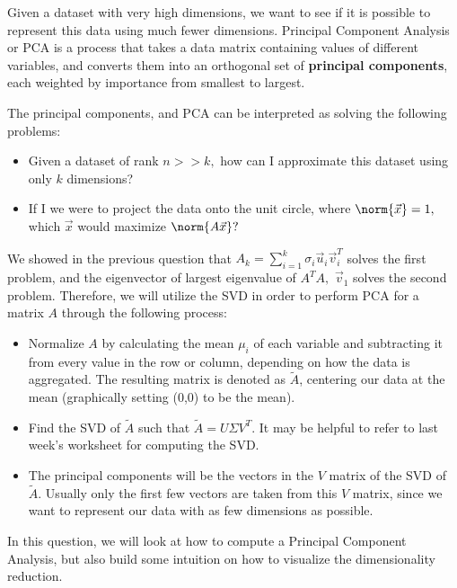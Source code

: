 

Given a dataset with very high dimensions, we want to see if it is possible to represent this data using much fewer dimensions.
Principal Component Analysis or PCA is a process that takes a data matrix containing values of different variables, and converts them into an orthogonal set of \textbf{principal components}, each weighted by importance from smallest to largest.

The principal components, and PCA can be interpreted as solving the following problems:
\begin{itemize}
  \item Given a dataset of rank $n >> k,$ how can I approximate this dataset using only $k$ dimensions?
  \item If I we were to project the data onto the unit circle, where $\norm{\vec{x}} = 1,$ which $\vec{x}$ would maximize $\norm{A \vec{x}}?$
\end{itemize}

We showed in the previous question that $A_{k} = \sum\limits_{i = 1}^{k} \sigma_{i} \vec{u}_{i} \vec{v}_{i}^{T}$ solves the first problem, and the eigenvector of largest eigenvalue of $A^{T}A,$ $\vec{v}_{1}$ solves the second problem. Therefore, we will utilize the SVD in order to perform PCA for a matrix $A$ through the following process:
\begin{itemize}
  \item Normalize $A$ by calculating the mean $\mu_{i}$ of each variable and subtracting it from every value in the row or column, depending on how the data is aggregated. The resulting matrix is denoted as $\tilde{A}$, centering our data at the mean (graphically setting (0,0) to be the mean).
  \item Find the SVD of $\tilde{A}$ such that $\tilde{A} = U \Sigma V^T$. It may be helpful to refer to last week's worksheet for computing the SVD.
  \item The principal components will be the vectors in the $V$ matrix of the SVD of $\tilde{A}.$
  Usually only the first few vectors are taken from this $V$ matrix, since we want to represent our data with as few dimensions as possible.
\end{itemize}

In this question, we will look at how to compute a Principal Component Analysis, but also build some intuition on how to visualize the dimensionality reduction.


